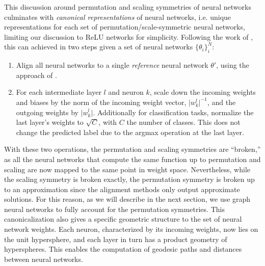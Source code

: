 This discussion around permutation and scaling symmetries of neural networks culminates with \textit{canonical representations} of neural networks, i.e. unique representations for each set of permutation/scale-symmetric neural networks, limiting our discussion to ReLU networks for simplicity. Following the work of \citep{pittorinoDeepNetworksToroids2022}, this can achieved in two steps given a set of neural networks $\{ \theta_i\}_i^N$:
\begin{enumerate}
    \item Align all neural networks to a single \textit{reference} neural network $\theta'$, using the approach of \citep{penaReBasinImplicitSinkhorn2023}. 
    \item For each intermediate layer $l$ and neuron $k$, scale down the incoming weights and biases by the norm of the incoming weight vector, $\vert w_k^l \vert^{-1}$, and the outgoing weights by $\vert w_k^l \vert$. Additionally for classification tasks, normalize the last layer's weights to $\sqrt{C}$, with $C$ the number of classes. This does not change the predicted label due to the argmax operation at the last layer. 
\end{enumerate}
With these two operations, the permutation and scaling symmetries are ``broken,'' as all the neural networks that compute the same function up to permutation and scaling are now mapped to the same point in weight space. Nevertheless, while the scaling symmetry is broken exactly, the permutation symmetry is broken up to an approximation since the alignment methods \citep{ainsworthGitReBasinMerging2023,penaReBasinImplicitSinkhorn2023} only output approximate solutions. For this reason, as we will describe in the next section, we use graph neural networks to fully account for the permutation symmetries. This canonicalization also gives a specific geometric structure to the set of neural network weights. Each neuron, characterized by its incoming weights, now lies on the unit hypersphere, and each layer in turn has a product geometry of hyperspheres. This enables the computation of geodesic paths and distances between neural networks. 